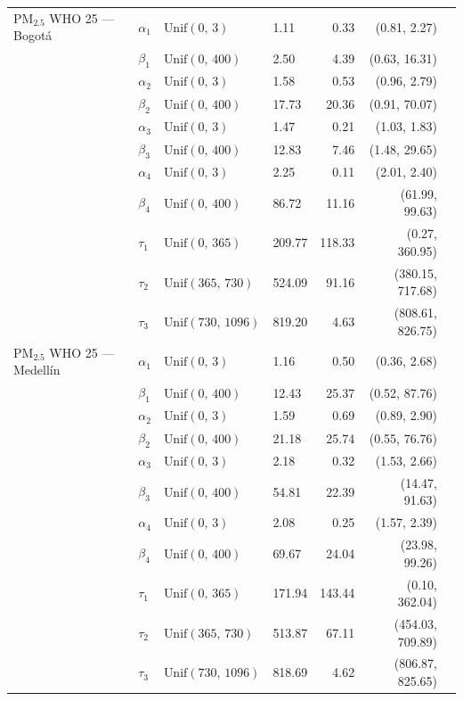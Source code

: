 \begin{longtable}{llllrrr}
\midrule
PM$_{2.5}$ WHO 25 --- Bogot\'{a} & $\alpha_{1}$ & $\text{Unif}(0,\,3)$ & 1.11 & 0.33 & (0.81, 2.27) \\
 & $\beta_{1}$ & $\text{Unif}(0,\,400)$ & 2.50 & 4.39 & (0.63, 16.31) \\
 & $\alpha_{2}$ & $\text{Unif}(0,\,3)$ & 1.58 & 0.53 & (0.96, 2.79) \\
 & $\beta_{2}$ & $\text{Unif}(0,\,400)$ & 17.73 & 20.36 & (0.91, 70.07) \\
 & $\alpha_{3}$ & $\text{Unif}(0,\,3)$ & 1.47 & 0.21 & (1.03, 1.83) \\
 & $\beta_{3}$ & $\text{Unif}(0,\,400)$ & 12.83 & 7.46 & (1.48, 29.65) \\
 & $\alpha_{4}$ & $\text{Unif}(0,\,3)$ & 2.25 & 0.11 & (2.01, 2.40) \\
 & $\beta_{4}$ & $\text{Unif}(0,\,400)$ & 86.72 & 11.16 & (61.99, 99.63) \\
 & $\tau_{1}$ & $\text{Unif}(0,\,365)$ & 209.77 & 118.33 & (0.27, 360.95) \\
 & $\tau_{2}$ & $\text{Unif}(365,\,730)$ & 524.09 & 91.16 & (380.15, 717.68) \\
 & $\tau_{3}$ & $\text{Unif}(730,\,1096)$ & 819.20 & 4.63 & (808.61, 826.75) \\
\midrule
PM$_{2.5}$ WHO 25 --- Medell\'{i}n & $\alpha_{1}$ & $\text{Unif}(0,\,3)$ & 1.16 & 0.50 & (0.36, 2.68) \\
 & $\beta_{1}$ & $\text{Unif}(0,\,400)$ & 12.43 & 25.37 & (0.52, 87.76) \\
 & $\alpha_{2}$ & $\text{Unif}(0,\,3)$ & 1.59 & 0.69 & (0.89, 2.90) \\
 & $\beta_{2}$ & $\text{Unif}(0,\,400)$ & 21.18 & 25.74 & (0.55, 76.76) \\
 & $\alpha_{3}$ & $\text{Unif}(0,\,3)$ & 2.18 & 0.32 & (1.53, 2.66) \\
 & $\beta_{3}$ & $\text{Unif}(0,\,400)$ & 54.81 & 22.39 & (14.47, 91.63) \\
 & $\alpha_{4}$ & $\text{Unif}(0,\,3)$ & 2.08 & 0.25 & (1.57, 2.39) \\
 & $\beta_{4}$ & $\text{Unif}(0,\,400)$ & 69.67 & 24.04 & (23.98, 99.26) \\
 & $\tau_{1}$ & $\text{Unif}(0,\,365)$ & 171.94 & 143.44 & (0.10, 362.04) \\
 & $\tau_{2}$ & $\text{Unif}(365,\,730)$ & 513.87 & 67.11 & (454.03, 709.89) \\
 & $\tau_{3}$ & $\text{Unif}(730,\,1096)$ & 818.69 & 4.62 & (806.87, 825.65) \\
\end{longtable}
